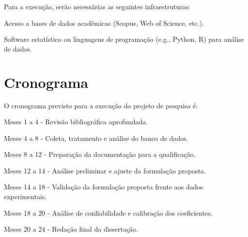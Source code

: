 Para a execução, serão necessárias as seguintes infraestruturas:
\begin{alineas}
    \item Acesso a bases de dados acadêmicas (Scopus, Web of Science, etc.).
    \item Software estatístico ou linguagens de programação (e.g., Python, R) para análise de dados.
\end{alineas}

\chapter{Cronograma}

O cronograma previsto para a execução do projeto de pesquisa é:
\begin{alineas}
    \item Meses 1 a 4 - Revisão bibliográfica aprofundada.
    \item Meses 4 a 8 - Coleta, tratamento e análise do banco de dados.
    \item Meses 8 a 12 - Preparação da documentação para a qualificação.
    \item Meses 12 a 14 - Análise preliminar e ajuste da formulação proposta.
    \item Meses 14 a 18 - Validação da formulação proposta frente aos dados experimentais.
    \item Meses 18 a 20 - Análise de confiabilidade e calibração dos coeficientes.
    \item Meses 20 a 24 - Redação final da dissertação.
\end{alineas}


